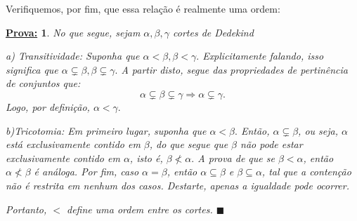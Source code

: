 \documentclass{article}
\newtheorem*{proof*}{\underline{Prova:}}
\renewcommand\qedsymbol{$\blacksquare$}
\begin{document}
Verifiquemos, por fim, que essa rela\c c\~ao \'e realmente uma ordem:
\begin{proof*} No que segue, sejam $\alpha, \beta, \gamma$ cortes de Dedekind

a) Transitividade: Suponha que $\alpha < \beta, \beta < \gamma.$ Explicitamente falando, isso significa que $\alpha\subsetneq\beta, \beta\subsetneq\gamma.$ A partir disto, segue das propriedades de pertin\^encia de conjuntos que:
$$
	\alpha\subsetneq\beta\subsetneq\gamma \Rightarrow \alpha\subsetneq\gamma.
$$
Logo, por defini\c c\~ao, $\alpha < \gamma.$

b)Tricotomia: Em primeiro lugar, suponha que $\alpha < \beta.$ Ent\~ao, $\alpha\subsetneq\beta$, ou seja, $\alpha$ est\'a exclusivamente contido em $\beta$, do que segue que $\beta$ n\~ao pode estar exclusivamente contido em $\alpha$, isto \'e, $\beta \nless \alpha.$ A prova de que se $\beta < \alpha$, ent\~ao $\alpha \nless \beta$ \'e an\'aloga. Por fim, caso $\alpha = \beta$, ent\~ao $\alpha\subseteq\beta$ e $\beta\subseteq\alpha$, tal que a conten\c c\~ao n\~ao \'e restrita em nenhum dos casos. Destarte, apenas a igualdade pode ocorrer.

Portanto, $<$ define uma ordem entre os cortes.
\qedsymbol
\end{proof*}
\end{document}
